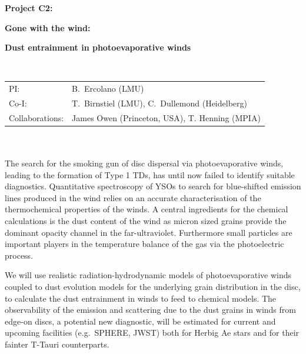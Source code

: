 \documentclass[10pt,fleqn,twoside]{article}
\begin{document}
\newpage


\setcounter{page}{1}

\centerline{\huge\bf\Tcol
%
%
%
%
%
 Project C2:}
\vspace{1em}

\centerline{\LARGE\bf\Tcol Gone with the wind:}\vspace{0.3em}
\centerline{\LARGE\bf\Tcol Dust entrainment in photoevaporative winds}

%
%
%
%
%
\vskip1.0cm


\\
\begin{tabular}{ll}
{\textsf{PI:}}                   & B.~Ercolano (LMU) \\
{\textsf{Co-I:}}                & T.~Birnstiel (LMU), C.~Dullemond (Heidelberg)\\
{\textsf{Collaborations:}}      &  James Owen (Princeton, USA),
                                    T. Henning (MPIA)\\

\end{tabular}


\vspace{1em}
 \\

\vspace{1em}
\\
The search for the smoking gun of disc dispersal via photoevaporative
winds, leading to the formation of Type 1 TDs,  has until
now failed to identify suitable diagnostics. Quantitative spectroscopy of
YSOs to search for blue-shifted emission lines produced in the wind
relies on an accurate characterisation of the thermochemical
properties of the winds. A central ingredients for the chemical
calculations is the dust content of the wind as micron sized grains
provide the dominant opacity channel in the far-ultraviolet.
Furthermore small particles are important players in the temperature
balance of the gas via the photoelectric process.  

We will use realistic radiation-hydrodynamic models of
photoevaporative winds coupled to dust evolution models for the
underlying grain distribution in the disc, to calculate the dust
entrainment in winds to feed to chemical models. The observability of
the emission and scattering due to the dust grains in winds from edge-on
discs, a potential new diagnostic, will be estimated for current and
upcoming facilities (e.g.\ SPHERE, JWST) both for Herbig
Ae stars and for their fainter T-Tauri counterparts.  
\end{document}
